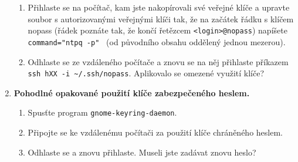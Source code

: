 \begin{enumerate}
\begin{enumerate}
      \item Přihlaste se na počítač, kam jste nakopírovali své veřejné klíče a
        upravte soubor s autorizovanými veřejnými klíči tak, že na začátek
        řádku s klíčem nopass (řádek poznáte tak, že končí řetězcem
        {\tt <login>@nopass}) napíšete
        \verb|command="ntpq -p" | (od původního
        obsahu oddělený jednou mezerou).

      \item Odhlaste se ze vzdáleného počítače a znovu se na něj přihlaste
        příkazem {\tt ssh hXX -i \textasciitilde/.ssh/nopass}. Aplikovalo se
        omezené využití klíče?

    \end{enumerate}


  \item {\bf Pohodlné opakované použití klíče zabezpečeného heslem.}

    \begin{enumerate}

      \item Spusťte program {\tt gnome-keyring-daemon}.

      \item Připojte se ke vzdálenému počítači za použití klíče chráněného
        heslem.

      \item Odhlaste se a znovu přihlaste. Museli jste zadávat znovu heslo?

    \end{enumerate}

\end{enumerate}

